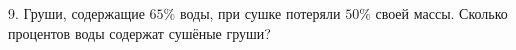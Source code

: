 9. Груши, содержащие $65\%$ воды, при сушке потеряли $50\%$ своей массы. Сколько процентов воды содержат сушёные груши?\\
